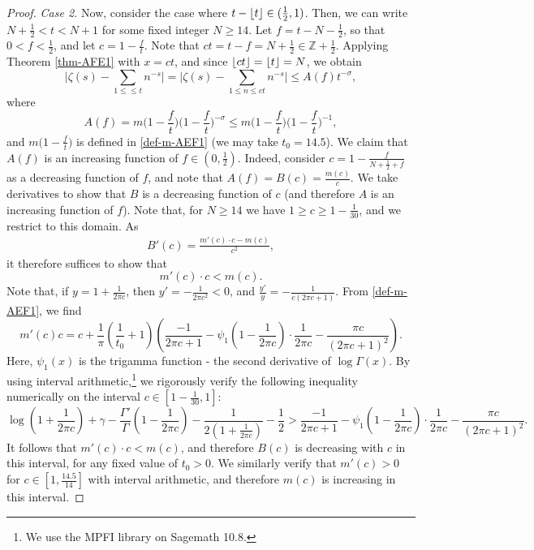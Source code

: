 \documentclass[11pt,letterpaper,oneside,reqno]{amsart}
\DeclarePairedDelimiter\floor{\lfloor}{\rfloor}
\renewcommand{\^}[1]{\widehat{#1}}
\newcommand{\Z}{{\mathbb{Z}}}
\newcommand{\s}{\sigma}
\numberwithin{equation}{section}
\theoremstyle{remark}
\begin{document}
\begin{proof}
\textit{Case 2.} 
Now, consider the case where $t-\floor{t}\in(\frac{1}{2},1)$. Then, we can write $N+\frac{1}{2}<t<N+1$ for some fixed integer $N \geq 14$. Let $f=t-N-\frac{1}{2}$, so that $0<f<\frac{1}{2}$, and let $c = 1-\frac{f}{t}$. Note that $ct=t-f=N+\frac{1}{2}\in\Z+\frac{1}{2}$. Applying Theorem \ref{thm-AFE1} with $x=ct$, and since $\floor{ct}=\floor{t}=N$, we obtain 
\[
\bigg|  \zeta(s)
    - \sum_{1\le \leq t}n^{-s} \bigg|  = \bigg|  \zeta(s)
    - \sum_{1\le n\leq ct}n^{-s} \bigg|  
     \leq A(f) t^{-\s},
\]
where \[
A(f)=m \Big(1-\frac{f}{t}\Big)\Big(1-\frac{f}{t}\Big)^{-\sigma} \leq m \Big(1-\frac{f}{t}\Big)\Big(1-\frac{f}{t}\Big)^{-1},\] and $m \Big(1-\frac{f}{t}\Big)$ is defined in \eqref{def-m-AEF1} (we may take $t_0=14.5$). 
We claim that $A(f)$ is an increasing function of $f\in(0,\frac{1}{2})$. Indeed, consider $c=1-\frac{f}{N+\frac{1}{2}+f}$ as a decreasing function of $f$, and note that $A(f)=B(c) = \frac{m (c)}{c}$. We take derivatives to show that $B$ is a decreasing function of $c$ (and therefore $A$ is an increasing function of $f$). Note that, for $N\ge14$ we have $1 \geq c \geq 1-\frac{1}{30}$, and we restrict to this domain. 
As
\begin{align*}
    B'(c)=\frac{m '(c)\cdot c-m (c)}{c^2},
\end{align*}
%
it therefore suffices to show that 
\[
m '(c)\cdot c < m (c).
\]
Note that, if $y=1+\frac{1}{2\pi c}$, then $y'=-\frac{1}{2\pi c^2}<0$, and $\frac{y'}{y}= -\frac{1}{c(2\pi c+1)}$. From \eqref{def-m-AEF1}, we find
\begin{equation*}
m '(c)c = c + \frac{1}{\pi }  \left( \frac{1}{t_0} + 1 \right) \left( \frac{-1}{2\pi c+1} - \psi_1\left(1-\frac{1}{2\pi c}\right)\cdot \frac{1}{2\pi c} -\frac{\pi c}{(2\pi c+1)^2}\right). 
\end{equation*}
Here, $\psi_1(x)$ is the trigamma function - the second derivative of $\log \Gamma(x)$. 
By using interval arithmetic,\footnote{We use the MPFI library \cite{mpfi} on Sagemath 10.8.} we rigorously verify the following inequality numerically on the interval $c\in [1-\frac{1}{30},1]$:
\[
     \log \left(1+\frac{1}{2\pi c} \right) + \gamma - \frac{\Gamma'}{\Gamma}\left(1-\frac{1}{2\pi c}\right)-\frac{1}{2(1+\frac{1}{2\pi c})}-\frac{1}{2} > 
      \frac{-1}{2\pi c+1} - \psi_1\left(1-\frac{1}{2\pi c}\right)\cdot \frac{1}{2\pi c} -\frac{\pi c}{(2\pi c+1)^2}.
\]
It follows that $m '(c)\cdot c < m (c)$, and therefore $B(c)$ is decreasing with $c$ in this interval, for any fixed value of $t_0>0$. We similarly verify that $m'(c)>0$ for $c\in[1,\frac{14.5}{14}]$ with interval arithmetic, and therefore $m(c)$ is increasing in this interval.

\end{proof}
\end{document}
